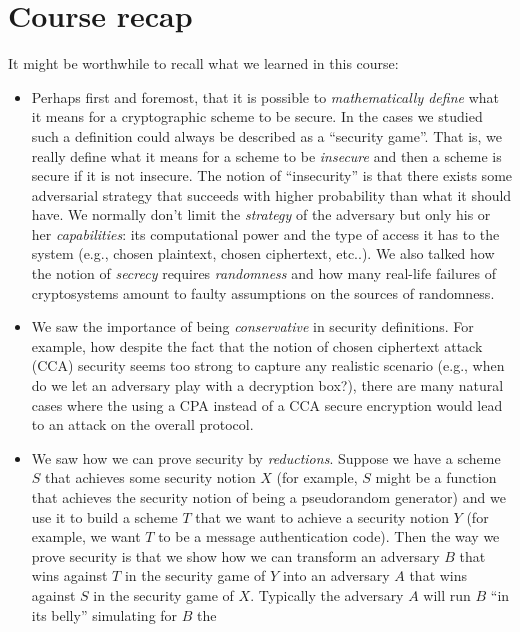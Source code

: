 \chapter{Course recap}\label{26-Course-recap}

It might be worthwhile to recall what we learned in this course:

\begin{itemize}
\item
  Perhaps first and foremost, that it is possible to
  \emph{mathematically define} what it means for a cryptographic scheme
  to be secure. In the cases we studied such a definition could always
  be described as a ``security game''. That is, we really define what it
  means for a scheme to be \emph{insecure} and then a scheme is secure
  if it is not insecure. The notion of ``insecurity'' is that there
  exists some adversarial strategy that succeeds with higher probability
  than what it should have. We normally don't limit the \emph{strategy}
  of the adversary but only his or her \emph{capabilities}: its
  computational power and the type of access it has to the system (e.g.,
  chosen plaintext, chosen ciphertext, etc..). We also talked how the
  notion of \emph{secrecy} requires \emph{randomness} and how many
  real-life failures of cryptosystems amount to faulty assumptions on
  the sources of randomness.
\item
  We saw the importance of being \emph{conservative} in security
  definitions. For example, how despite the fact that the notion of
  chosen ciphertext attack (CCA) security seems too strong to capture
  any realistic scenario (e.g., when do we let an adversary play with a
  decryption box?), there are many natural cases where the using a CPA
  instead of a CCA secure encryption would lead to an attack on the
  overall protocol.
\item
  We saw how we can prove security by \emph{reductions}. Suppose we have
  a scheme \(S\) that achieves some security notion \(X\) (for example,
  \(S\) might be a function that achieves the security notion of being a
  pseudorandom generator) and we use it to build a scheme \(T\) that we
  want to achieve a security notion \(Y\) (for example, we want \(T\) to
  be a message authentication code). Then the way we prove security is
  that we show how we can transform an adversary \(B\) that wins against
  \(T\) in the security game of \(Y\) into an adversary \(A\) that wins
  against \(S\) in the security game of \(X\). Typically the adversary
  \(A\) will run \(B\) ``in its belly'' simulating for \(B\) the

\end{itemize}

